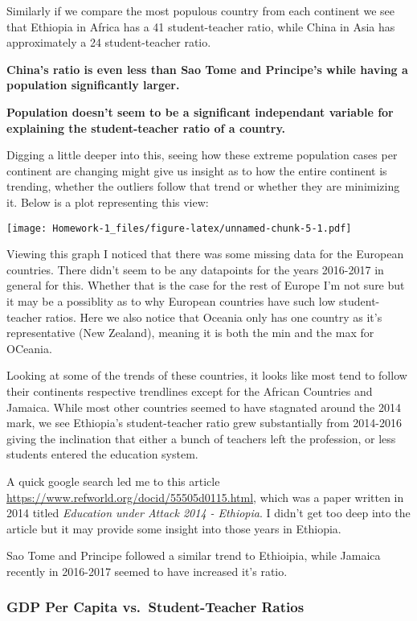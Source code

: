 \documentclass[
]{article}
\begin{document}
Similarly if we compare the most populous country from each continent we
see that Ethiopia in Africa has a 41 student-teacher ratio, while China
in Asia has approximately a 24 student-teacher ratio.

\textbf{China's ratio is even less than Sao Tome and Principe's while
having a population significantly larger.}

\textbf{Population doesn't seem to be a significant independant variable
for explaining the student-teacher ratio of a country.}

Digging a little deeper into this, seeing how these extreme population
cases per continent are changing might give us insight as to how the
entire continent is trending, whether the outliers follow that trend or
whether they are minimizing it. Below is a plot representing this view:

\texttt{[image: Homework-1\_files/figure-latex/unnamed-chunk-5-1.pdf]}

Viewing this graph I noticed that there was some missing data for the
European countries. There didn't seem to be any datapoints for the years
2016-2017 in general for this. Whether that is the case for the rest of
Europe I'm not sure but it may be a possiblity as to why European
countries have such low student-teacher ratios. Here we also notice that
Oceania only has one country as it's representative (New Zealand),
meaning it is both the min and the max for OCeania.

Looking at some of the trends of these countries, it looks like most
tend to follow their continents respective trendlines except for the
African Countries and Jamaica. While most other countries seemed to have
stagnated around the 2014 mark, we see Ethiopia's student-teacher ratio
grew substantially from 2014-2016 giving the inclination that either a
bunch of teachers left the profession, or less students entered the
education system.

A quick google search led me to this article
\url{https://www.refworld.org/docid/55505d0115.html}, which was a paper
written in 2014 titled \emph{Education under Attack 2014 - Ethiopia}. I
didn't get too deep into the article but it may provide some insight
into those years in Ethiopia.

Sao Tome and Principe followed a similar trend to Ethioipia, while
Jamaica recently in 2016-2017 seemed to have increased it's ratio.

\hypertarget{gdp-per-capita-vs.-student-teacher-ratios}{%
\subsubsection{GDP Per Capita vs.~Student-Teacher
Ratios}\label{gdp-per-capita-vs.-student-teacher-ratios}}
\end{document}
